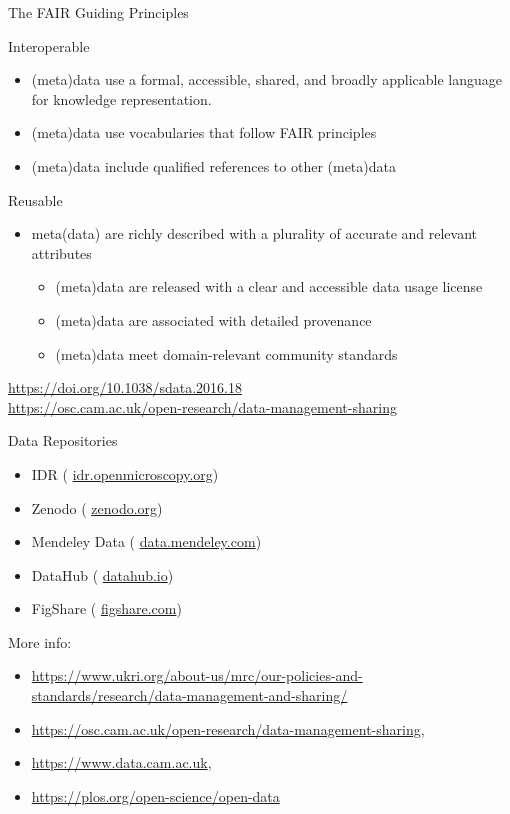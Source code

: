 \documentclass[ignorenonframetext,aspectratio=169,10pt,xcolor=table]{beamer}
\begin{document}
\begin{frame}{The FAIR Guiding Principles}
  \begin{block}{Interoperable}
    \begin{itemize}
    \item (meta)data use a formal, accessible, shared, and broadly applicable language for knowledge representation.
    \item (meta)data use vocabularies that follow FAIR principles
    \item (meta)data include qualified references to other (meta)data
    \end{itemize}
  \end{block}

  \begin{block}{Reusable}
    \begin{itemize}
    \item meta(data) are richly described with a plurality of accurate and relevant attributes
      \begin{itemize}
      \item (meta)data are released with a clear and accessible data usage license
      \item (meta)data are associated with detailed provenance
      \item (meta)data meet domain-relevant community standards
      \end{itemize}
    \end{itemize}
  \end{block}

  \begin{flushright} \tiny
    \url{https://doi.org/10.1038/sdata.2016.18}\\
    \url{https://osc.cam.ac.uk/open-research/data-management-sharing}
  \end{flushright}

\end{frame}

\begin{frame}{Data Repositories}
  \begin{itemize}
    \item IDR ( \url{idr.openmicroscopy.org})
    \item Zenodo ( \url{zenodo.org})
    \item Mendeley Data ( \url{data.mendeley.com})
    \item DataHub ( \url{datahub.io})
    \item FigShare ( \url{figshare.com})
  \end{itemize}

  More info:
  \begin{itemize} \tiny
    \item \url{https://www.ukri.org/about-us/mrc/our-policies-and-standards/research/data-management-and-sharing/}
    \item \url{https://osc.cam.ac.uk/open-research/data-management-sharing},
    \item \url{https://www.data.cam.ac.uk},
    \item \url{https://plos.org/open-science/open-data}
  \end{itemize}

  \end{frame}
\end{document}
